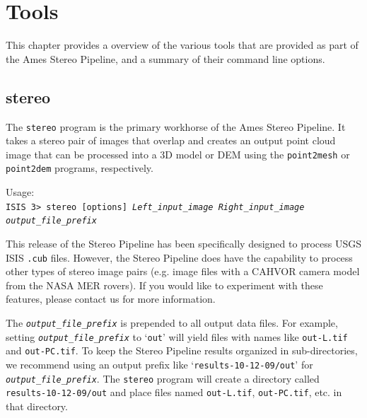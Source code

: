 \chapter{Tools}

This chapter provides a overview of the various tools that are
provided as part of the Ames Stereo Pipeline, and a summary of their
command line options.


\section{stereo}
\label{stereo}

The \texttt{stereo} program is the primary workhorse of the Ames
Stereo Pipeline.  It takes a stereo pair of images that overlap and
creates an output point cloud image that can be processed into a 3D
model or DEM using the \texttt{point2mesh} or \texttt{point2dem}
programs, respectively.

\medskip

Usage:\\
\hspace*{2em}\texttt{ISIS 3> stereo [options] \textit{Left\_input\_image Right\_input\_image output\_file\_prefix}}

\medskip

This release of the Stereo Pipeline has been specifically designed to
process USGS ISIS \texttt{.cub} files. However, the Stereo Pipeline
does have the capability to process other types of stereo image pairs
(e.g. image files with a CAHVOR camera model from the NASA MER
rovers).  If you would like to experiment with these features, please
contact us for more information.

The \texttt{\textit{output\_file\_prefix}} is prepended to all
output data files.  For example, setting \texttt{\textit{output\_file\_prefix}}
to `\texttt{out}' will yield files with names like \texttt{out-L.tif}
and \texttt{out-PC.tif}.  To keep the Stereo Pipeline results organized
in sub-directories, we recommend using an output prefix like
`\texttt{results-10-12-09/out}' for \texttt{\textit{output\_file\_prefix}}.  The
\texttt{stereo} program will create a directory called
\texttt{results-10-12-09/out} and place files named \texttt{out-L.tif},
\texttt{out-PC.tif}, etc. in that directory.

